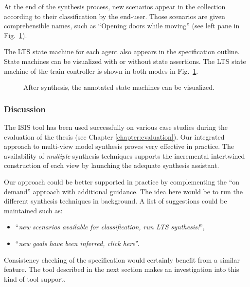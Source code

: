 At the end of the synthesis process, new scenarios appear in the collection according to their classification by the end-user. Those scenarios are given comprehensible names, such as ``Opening doors while moving'' (see left pane in Fig.~\ref{image:isis-after}).

The LTS state machine for each agent also appears in the specification outline. State machines can be visualized with or without state assertions. The LTS state machine of the train controller is shown in both modes in Fig.~\ref{image:isis-after}. 

\begin{figure}
\centering{}
  \caption{After synthesis, the annotated state machines can be visualized.\label{image:isis-after}}
\end{figure}

\subsubsection*{Discussion}

The ISIS tool has been used successfully on various case studies during the evaluation of the thesis (see Chapter \ref{chapter:evaluation}). Our integrated approach to multi-view model synthesis proves very effective in practice. The availability of \emph{multiple} synthesis techniques supports the incremental intertwined construction of each view by launching the adequate synthesis assistant.

Our approach could be better supported in practice by complementing the ``on demand'' approach with additional guidance. The idea here would be to run the different synthesis techniques in background. A list of suggestions could be maintained such as:
\begin{itemize}
\item ``\emph{new scenarios available for classification, run LTS synthesis!}'',
\item ``\emph{new goals have been inferred, click here}''. 
\end{itemize}
Consistency checking of the specification would certainly benefit from a similar feature. The tool described in the next section makes an investigation into this kind of tool support. 
